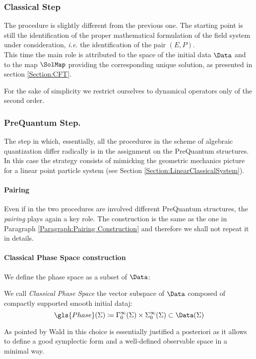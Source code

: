 \documentclass[Main]{subfiles}
\begin{document}
	\subsubsection{Classical Step}
		The procedure is slightly different from the previous one.	
		The starting point is still the identification of the  proper mathematical formulation of  the field system under consideration, \textit{i.e.} the identification of the pair $(E,P)$.
		\\
		This time the main role is attributed to the space of the initial data $\Data$ and to the map $\SolMap$ providing the corresponding unique solution, as presented in section \ref{Section:CFT}.

		\begin{NB}
		
				For the sake of simplicity we restrict ourselves to dynamical operators only of the second order.
		\end{NB}

	\subsubsection{PreQuantum Step.}
		The step in which, essentially, all the procedures in the scheme of algebraic quantization differ radically is in the assignment on the PreQuantum structures.
		In this case the strategy consists of mimicking the geometric mechanics picture for a linear point particle system (see Section \ref{Section:LinearClassicalSystem}).
				
		\paragraph{Pairing}
		Even if in the two procedures are involved different PreQuantum structures, the \emph{pairing} plays again a key role.
		The construction is the same as the one in Paragraph \ref{Paragraph:Pairing Construction} and therefore we shall not repeat it in details.

		\paragraph{Classical Phase Space construction}
			We define the phase space as a subset of $\Data$:
			\begin{definition}
				We call \emph{Classical Phase Space} the vector subspace of $\Data$ composed of compactly supported smooth initial dataj:
				\begin{displaymath}
					\gls{Phase}(\Sigma) \coloneqq \Gamma_0^\infty(\Sigma) \times \Sigma_0^\infty (\Sigma) \subset \Data(\Sigma)			
				\end{displaymath}				
			\end{definition}			
			As pointed by Wald in \cite{Wald1994} this choice is essentially justified a posteriori as it allows to define a good symplectic form and a well-defined observable space in a minimal way.
			
\end{document}
